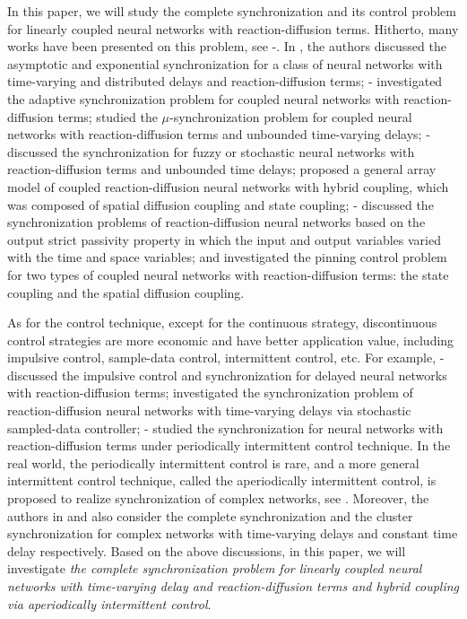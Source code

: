 \documentclass[review]{elsarticle}
\begin{document}
In this paper, we will study the complete synchronization and its control problem for linearly coupled neural networks with reaction-diffusion terms. Hitherto, many works have been presented on this problem, see \cite{WC2007}-\cite{WWHR2016}. In \cite{WC2007}, the authors discussed the asymptotic and exponential synchronization for a class of neural networks with time-varying and distributed delays and reaction-diffusion terms; \cite{SYL2009}-\cite{WWG2014} investigated the adaptive synchronization problem for coupled neural networks with reaction-diffusion terms; \cite{liu2010} studied the $\mu$-synchronization problem for coupled neural networks with reaction-diffusion terms and unbounded time-varying delays; \cite{YJ2011}-\cite{SM2012} discussed the synchronization for fuzzy or stochastic neural networks with reaction-diffusion terms and unbounded time delays; \cite{WW2014} proposed a general array model of coupled reaction-diffusion neural networks with hybrid coupling, which was composed of spatial diffusion coupling and state coupling; \cite{WWG2011}-\cite{WWH2015} discussed the synchronization problems of reaction-diffusion neural networks based on the output strict passivity property in which the input and output variables varied with the time and space variables; and \cite{WWHR2016} investigated the pinning control problem for two types of coupled neural networks with reaction-diffusion terms: the state coupling and the spatial diffusion coupling.

As for the control technique, except for the continuous strategy, discontinuous control strategies are more economic and have better application value, including impulsive control, sample-data control, intermittent control, etc. For example, \cite{HJT2010}-\cite{YCY2013} discussed the impulsive control and synchronization for delayed neural networks with reaction-diffusion terms; \cite{RDZ2015} investigated the synchronization problem of reaction-diffusion neural networks with time-varying delays via stochastic sampled-data controller; \cite{HYJT2012}-\cite{MJWLXL2014} studied the synchronization for neural networks with reaction-diffusion terms under periodically intermittent control technique. In the real world, the periodically intermittent control \cite{LiuC11} is rare, and a more general intermittent control technique, called the aperiodically intermittent control, is proposed to realize synchronization of complex networks, see \cite{LC2015,esi2015}. Moreover, the authors in \cite{LC15} and \cite{LLC15} also consider the complete synchronization and the cluster synchronization for complex networks with time-varying delays and constant time delay respectively. Based on the above discussions, in this paper, we will investigate \emph{the complete synchronization problem for linearly coupled neural networks with time-varying delay and reaction-diffusion terms and hybrid coupling via aperiodically intermittent control}.
\end{document}

